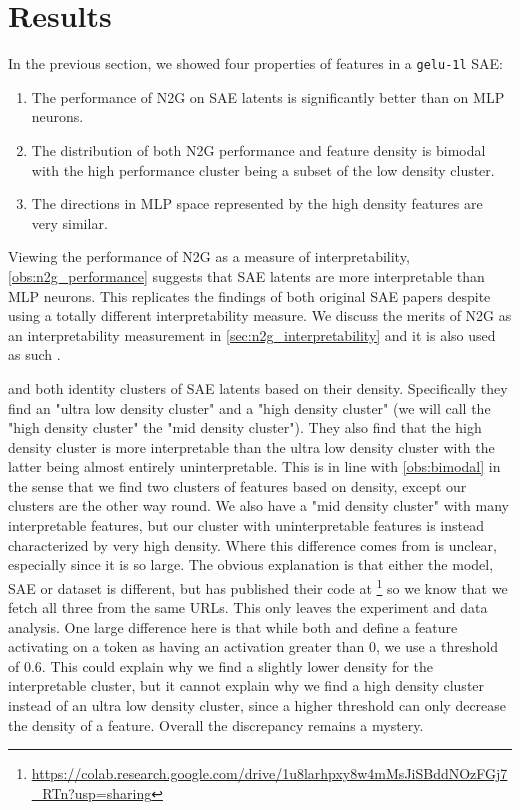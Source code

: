 \section{Results}
In the previous section, we showed four properties of features in a \texttt{gelu-1l} SAE: 
\begin{enumerate}[ref={observation~\arabic*}]
    \item The performance of N2G on SAE latents is significantly better than on MLP neurons.\label{obs:n2g_performance}
    \item The distribution of both N2G performance and feature density is bimodal with the high performance cluster being a subset of the low density cluster.\label{obs:bimodal}
    \item The directions in MLP space represented by the high density features are very similar.\label{obs:directions}
\end{enumerate}
Viewing the performance of N2G as a measure of interpretability, \ref{obs:n2g_performance} suggests that SAE latents are more interpretable than MLP neurons.
This replicates the findings of both original SAE papers \parencite{bricken_towards_2023}\parencite{cunningham_sparse_2023} despite using a totally different interpretability measure.
We discuss the merits of N2G as an interpretability measurement in \autoref{sec:n2g_interpretability} and it is also used as such \textcite{gao_scaling_2024}.

\textcite{bricken_towards_2023} and \textcite{nanda_open_2023} both identity clusters of SAE latents based on their density.
Specifically they find an "ultra low density cluster" and a "high density cluster" (we will call the "high density cluster" the "mid density cluster").
They also find that the high density cluster is more interpretable than the ultra low density cluster with the latter being almost entirely uninterpretable.
This is in line with \ref{obs:bimodal} in the sense that we find two clusters of features based on density, except our clusters are the other way round.
We also have a "mid density cluster" with many interpretable features, but our cluster with uninterpretable features is instead characterized by very high density.
Where this difference comes from is unclear, especially since it is so large.
The obvious explanation is that either the model, SAE or dataset is different, but \textcite{nanda_open_2023} has published their code at \footnote{\url{https://colab.research.google.com/drive/1u8larhpxy8w4mMsJiSBddNOzFGj7_RTn?usp=sharing}} so we know that we fetch all three from the same URLs.
This only leaves the experiment and data analysis.
One large difference here is that while both \textcite{bricken_towards_2023} and \textcite{nanda_open_2023} define a feature activating on a token as having an activation greater than $0$, we use a threshold of $0.6$.
This could explain why we find a slightly lower density for the interpretable cluster, but it cannot explain why we find a high density cluster instead of an ultra low density cluster, since a higher threshold can only decrease the density of a feature.
Overall the discrepancy remains a mystery.

